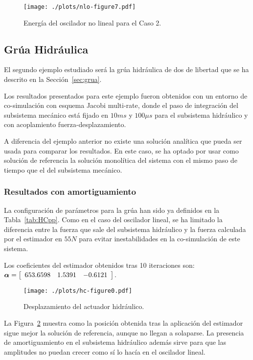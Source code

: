 \begin{figure}[ht!]\centering
	\texttt{[image: ./plots/nlo-figure7.pdf]}
	\caption{Energía del oscilador no lineal para el Caso 2.}
	\label{fig:OsciladorNoLinealEnergia2}
\end{figure}

\subsection{Grúa Hidráulica}
\label{sec:res_grua}

El segundo ejemplo estudiado será la grúa hidráulica de dos de libertad que se ha descrito en la Sección~\ref{sec:grua}. 

Los resultados presentados para este ejemplo fueron obtenidos con un entorno de co-simulación con esquema Jacobi multi-rate, donde el paso de integración del subsistema mecánico está fijado en $10\unit{ms}$ y $100\unit{\mu s}$ para el subsistema hidráulico y con acoplamiento fuerza-desplazamiento.

A diferencia del ejemplo anterior no existe una solución analítica que pueda ser usada para comparar los resultados.
En este caso, se ha optado por usar como solución de referencia la solución monolítica del sistema con el mismo paso de tiempo que el del subsistema mecánico.

\subsubsection{Resultados con amortiguamiento}
\label{subsec:res_grua}

La configuración de parámetros para la grúa han sido ya definidos en la Tabla~\ref{tab:HCpp}.
Como en el caso del oscilador lineal, se ha limitado la diferencia entre la fuerza que sale del subsistema hidráulico y la fuerza calculada por el estimador en $55\unit{N}$ para evitar inestabilidades en la co-simulación de este sistema.


Los coeficientes del estimador obtenidos tras 10 iteraciones son:
$\coefficients = \sqbr{\matr{ccc}{653.6598 & 1.5391 & -0.6121}}$.


\begin{figure}[ht!]\centering
	\texttt{[image: ./plots/hc-figure0.pdf]}
	\caption{Desplazamiento del actuador hidráulico.}
	\label{fig:GruaPos}
\end{figure}

La Figura~\ref{fig:GruaPos} muestra como la posición obtenida tras la aplicación del estimador sigue mejor la solución de referencia, aunque no llegan a solaparse.
La presencia de amortiguamiento en el subsistema hidráulico además sirve para que las amplitudes no puedan crecer como sí lo hacía en el oscilador lineal.



